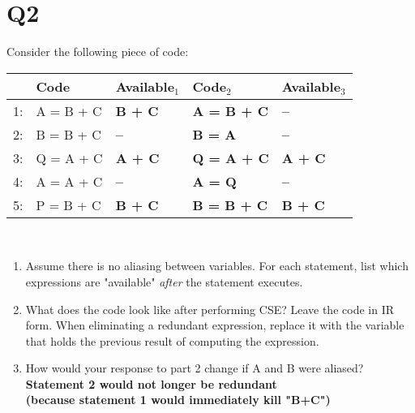 \documentclass{report}
\begin{document}
\section{Q2}
Consider the following piece of code:
\begin{center}
  \begin{tabular}{|c|l|>{\bfseries}l|>{\bfseries}l|>{\bfseries}l|}
    \hline
  	& Code & Available$_1$ & Code$_2$ & Available$_3$ \\
    \hline
    1: & A = B + C & B + C & A = B + C & --    \\
    2: & B = B + C & --    & B = A     & --    \\
    3: & Q = A + C & A + C & Q = A + C & A + C \\
    4: & A = A + C & --    & A = Q     & --    \\
    5: & P = B + C & B + C & B = B + C & B + C \\
    \hline
  \end{tabular} \ \\
\end{center}
\begin{enumerate}
  \item Assume there is no aliasing between variables. For each statement, list which expressions are "available" \textit{after} the statement executes.
  \item What does the code look like after performing CSE? Leave the code in IR form.
When eliminating a redundant expression, replace it with the variable that holds
the previous result of computing the expression.
  \item How would your response to part 2 change if A and B were aliased? \\
  \textbf{Statement 2 would not longer be redundant \\ (because statement 1 would immediately kill "B+C")}
\end{enumerate}
\end{document}
